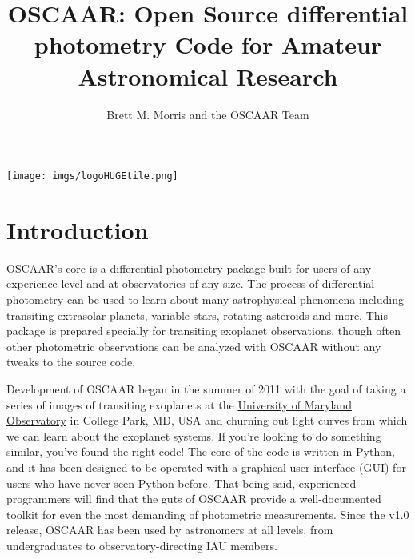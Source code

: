 \documentclass[a4paper]{article}
\begin{document}
\title{\textbf{OSCAAR}: Open Source differential photometry Code for Amateur Astronomical Research}
\author{Brett M. Morris and the OSCAAR Team}
\maketitle
\begin{center}
\texttt{[image: imgs/logoHUGEtile.png]}
\end{center}
\pagebreak
\tableofcontents
\pagebreak


\section{Introduction}

OSCAAR's core is a differential photometry package built for users of any experience level and at observatories of any size. The process of differential photometry can be used to learn about many astrophysical phenomena including transiting extrasolar planets, variable stars, rotating asteroids and more. This package is prepared specially for transiting exoplanet observations, though often other photometric observations can be analyzed with OSCAAR without any tweaks to the source code.

Development of OSCAAR began in the summer of 2011 with the goal of taking a series of images of transiting exoplanets at the \href{http://www.astro.umd.edu/openhouse/}{University of Maryland Observatory} in College Park, MD, USA and churning out light curves from which we can learn about the exoplanet systems. If you're looking to do something similar, you've found the right code! The core of the code is written in \href{http://www.python.org/}{Python}, and it has been designed to be operated with a graphical user interface (GUI) for users who have never seen Python before. That being said, experienced programmers will find that the guts of OSCAAR provide a well-documented toolkit for even the most demanding of photometric measurements. Since the v1.0 release, OSCAAR has been used by astronomers at all levels, from undergraduates to observatory-directing IAU members.
\end{document}
